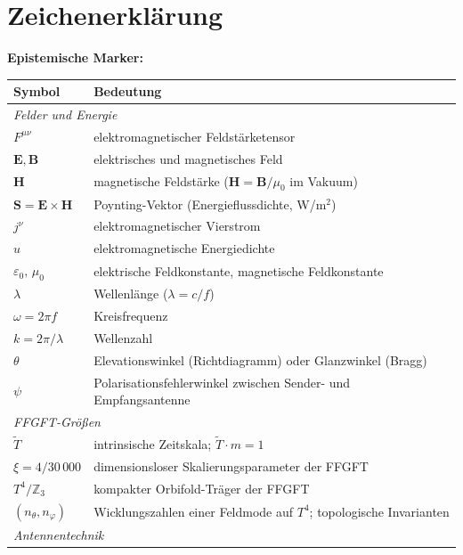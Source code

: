 \section*{Zeichenerklärung}

\medskip
\textbf{Epistemische Marker:}\par


\medskip
\begin{longtable}{@{}lp{11cm}@{}}
\toprule
\textbf{Symbol} & \textbf{Bedeutung} \\
\midrule
\multicolumn{2}{l}{\textit{Felder und Energie}} \\
$F^{\mu\nu}$ & elektromagnetischer Feldstärketensor \\
$\mathbf{E}, \mathbf{B}$ & elektrisches und magnetisches Feld \\
$\mathbf{H}$ & magnetische Feldstärke ($\mathbf{H} = \mathbf{B}/\mu_0$ im Vakuum) \\
$\mathbf{S} = \mathbf{E}\times\mathbf{H}$ & Poynting-Vektor (Energieflussdichte, W/m$^2$) \\
$j^\nu$ & elektromagnetischer Vierstrom \\
$u$ & elektromagnetische Energiedichte \\
$\varepsilon_0,\,\mu_0$ & elektrische Feldkonstante, magnetische Feldkonstante \\
$\lambda$ & Wellenlänge ($\lambda = c/f$) \\
$\omega = 2\pi f$ & Kreisfrequenz \\
$k = 2\pi/\lambda$ & Wellenzahl \\
$\theta$ & Elevationswinkel (Richtdiagramm) oder Glanzwinkel (Bragg) \\
$\psi$ & Polarisationsfehlerwinkel zwischen Sender- und Empfangsantenne \\
\midrule
\multicolumn{2}{l}{\textit{FFGFT-Größen}} \\
$\tilde{T}$ & intrinsische Zeitskala; $\tilde{T} \cdot m = 1$ \\
$\xi = 4/30\,000$ & dimensionsloser Skalierungsparameter der FFGFT \\
$T^4/\mathbb{Z}_3$ & kompakter Orbifold-Träger der FFGFT \\
$(n_\theta, n_\varphi)$ & Wicklungszahlen einer Feldmode auf $T^4$; topologische Invarianten \\
\midrule
\multicolumn{2}{l}{\textit{Antennentechnik}} \\

\end{longtable}
